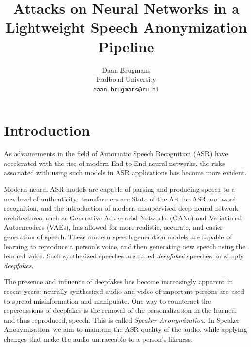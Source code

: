 \documentclass[11pt]{article}
\title{Attacks on Neural Networks in a Lightweight Speech Anonymization Pipeline}
\author{Daan Brugmans \\
  Radboud University\\
  \texttt{daan.brugmans@ru.nl}
}
\begin{document}
\maketitle
        


\begin{abstract}
  
\end{abstract}

\section{Introduction}
As advancements in the field of Automatic Speech Recognition (ASR) have accelerated with the rise of modern End-to-End neural networks, the risks associated with using such models in ASR applications has become more evident.

Modern neural ASR models are capable of parsing and producing speech to a new level of authenticity: transformers are State-of-the-Art for ASR and word recognition, and the introduction of modern unsupervised deep neural network architectures, such as Generative Adversarial Networks (GANs) and Variational Autoencoders (VAEs), has allowed for more realistic, accurate, and easier generation of speech.
These modern speech generation models are capable of learning to reproduce a person's voice, and then generating new speech using the learned voice.
Such synthesized speeches are called \textit{deepfaked} speeches, or simply \textit{deepfakes}.

The presence and influence of deepfakes has become increasingly apparent in recent years: neurally synthesized audio and video of important persons are used to spread misinformation and manipulate.
One way to counteract the repercussions of deepfakes is the removal of the personalization in the learned, and thus reproduced, speech.
This is called \textit{Speaker Anonymization}.
In Speaker Anonymization, we aim to maintain the ASR quality of the audio, while applying changes that make the audio untraceable to a person's likeness.
\end{document}

